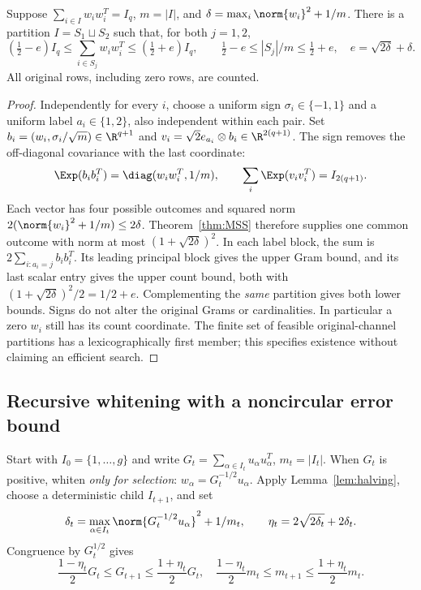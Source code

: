 \begin{lemma}\label{lem:halving}
Suppose $\sum_{i\in I}w_iw_i^T=I_q$, $m=|I|$, and
$\delta=\max_i\norm{w_i}^2+1/m$. There is a partition $I=S_1\sqcup S_2$
such that, for both $j=1,2$,
\begin{equation}\label{eq:half}
 (\tfrac12-e)I_q\leq\sum_{i\in S_j}w_iw_i^T\leq(\tfrac12+e)I_q,
 \qquad \tfrac12-e\leq |S_j|/m\leq\tfrac12+e,
 \quad e=\sqrt{2\delta}+\delta.
\end{equation}
All original rows, including zero rows, are counted.
\end{lemma}
\begin{proof}
Independently for every $i$, choose a uniform sign $\sigma_i\in\{-1,1\}$
and a uniform label $a_i\in\{1,2\}$, also independent within each pair.
Set $b_i=(w_i,\sigma_i/\sqrt m)\in\R^{q+1}$ and
$v_i=\sqrt2 e_{a_i}\otimes b_i\in\R^{2(q+1)}$.
The sign removes the off-diagonal covariance with the last coordinate:
\[
 \Exp(b_ib_i^T)=\diag(w_iw_i^T,1/m),\qquad
 \sum_i\Exp(v_iv_i^T)=I_{2(q+1)}.
\]
Each vector has four possible outcomes and squared norm
$2(\norm{w_i}^2+1/m)\leq2\delta$. Theorem~\ref{thm:MSS} therefore supplies
one common outcome with norm at most $(1+\sqrt{2\delta})^2$.
In each label block, the sum is $2\sum_{i:a_i=j}b_ib_i^T$.
Its leading principal block gives the upper Gram bound, and its last scalar
entry gives the upper count bound, both with
$(1+\sqrt{2\delta})^2/2=1/2+e$. Complementing the \emph{same} partition gives
both lower bounds. Signs do not alter the original Grams or cardinalities.
In particular a zero $w_i$ still has its count coordinate. The finite set of
feasible original-channel partitions has a lexicographically first member;
this specifies existence without claiming an efficient search.
\end{proof}

\subsection{Recursive whitening with a noncircular error bound}
Start with $I_0=\{1,\ldots,g\}$ and write
$G_t=\sum_{\alpha\in I_t}u_\alpha u_\alpha^T$, $m_t=|I_t|$.
When $G_t$ is positive, whiten \emph{only for selection}:
$w_\alpha=G_t^{-1/2}u_\alpha$. Apply Lemma~\ref{lem:halving}, choose a
deterministic child $I_{t+1}$, and set
\[
 \delta_t=\max_{\alpha\in I_t}\norm{G_t^{-1/2}u_\alpha}^2+1/m_t,
 \qquad\eta_t=2\sqrt{2\delta_t}+2\delta_t.
\]
Congruence by $G_t^{1/2}$ gives
\begin{equation}\label{eq:recurrence}
 \frac{1-\eta_t}{2}G_t\leq G_{t+1}\leq\frac{1+\eta_t}{2}G_t,
 \quad\frac{1-\eta_t}{2}m_t\leq m_{t+1}\leq\frac{1+\eta_t}{2}m_t.
\end{equation}

